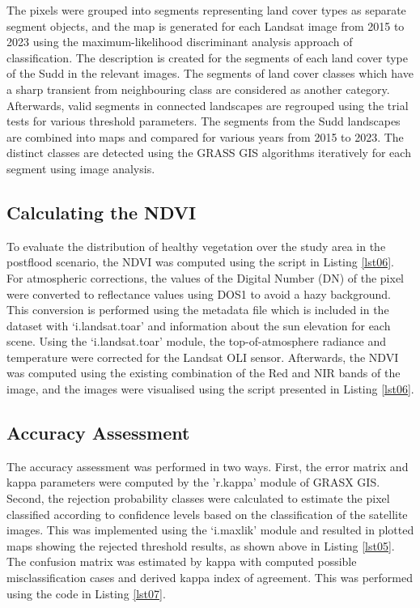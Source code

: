 \documentclass[analytics,article,accept,pdftex,moreauthors]{Definitions/mdpi}
\begin{document}
The pixels were grouped into segments representing land cover types as separate segment objects, and the map is generated for each Landsat image from 2015 to 2023 using the maximum-likelihood discriminant analysis approach of classification. The description is created for the segments of each land cover type of the Sudd in the relevant images. The segments of land cover classes which have a sharp transient from neighbouring class are considered as another category. Afterwards, valid segments in connected landscapes are regrouped using the trial tests for various threshold parameters. The segments from the Sudd landscapes are combined into maps and compared for various years from 2015 to 2023. The distinct classes are detected using the GRASS GIS algorithms iteratively for each segment using image analysis.

\subsection{Calculating the NDVI}

To evaluate the distribution of healthy {vegetation} over the study area in the postflood scenario, the NDVI was computed using the script in Listing \ref{lst06}. For atmospheric corrections, the values of the Digital Number (DN) of the pixel were converted to reflectance values using DOS1 to avoid a hazy background. This conversion is performed using the metadata file which is included in the dataset with `i.landsat.toar' and information about the sun elevation for each scene. Using the `i.landsat.toar' module, the top-of-atmosphere radiance and temperature were corrected for the Landsat OLI sensor. Afterwards, the NDVI was computed using the existing combination of the Red and NIR bands of the image, and the images were visualised using the script presented in Listing \ref{lst06}. 

\subsection{Accuracy Assessment}

The accuracy assessment was performed in two ways. First, the error matrix and kappa parameters were computed by the 'r.kappa' module of GRASX GIS. Second, the rejection probability classes were calculated to estimate the pixel classified according to confidence levels based on the classification of the satellite images. This was implemented using the `i.maxlik' module and resulted in plotted maps showing the rejected threshold results, as shown above in Listing \ref{lst05}. The confusion matrix was estimated by kappa with computed possible misclassification cases and derived kappa index of agreement. This was performed using the code in Listing \ref{lst07}.
\end{document}
